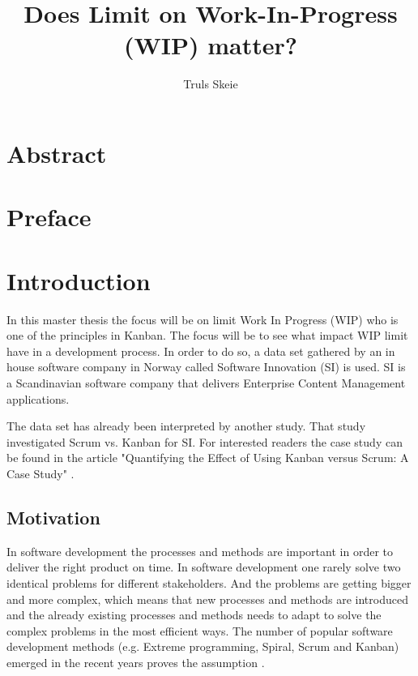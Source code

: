 \documentclass[UKenglish]{ifimaster}  %
\title{Does Limit on Work-In-Progress (WIP) matter?}        %
\author{Truls Skeie}                      %
\begin{document}
\ififorside{}
\frontmatter{}
\maketitle{}

\chapter*{Abstract}                   %

\tableofcontents{}
\listoffigures{}
\listoftables{}
\lstlistoflistings{}

\chapter*{Preface}                    %

\mainmatter{}
\chapter{Introduction}
\label{chap:intro}
In this master thesis the focus will be on limit Work In Progress (WIP) who is one of the principles in Kanban. The focus will be to see what impact WIP limit have in a development process. In order to do so, a data set gathered by an in house software company in Norway called Software Innovation (SI) is used. SI is a Scandinavian software company that delivers Enterprise Content Management applications. 

The data set has already been interpreted by another study. That study investigated Scrum vs. Kanban for SI. For interested readers the case study can be found in the article "Quantifying the Effect of Using Kanban versus Scrum: A Case Study" \parencite{Dag}. 

\section{Motivation}
In software development the processes and methods are important in order to deliver the right product on time. In software development one rarely solve two identical problems for different stakeholders. And the problems are getting bigger and more complex, which means that new processes and methods are introduced and the already existing processes and methods needs to adapt to solve the complex problems in the most efficient ways.  The number of popular software development methods  (e.g. Extreme programming, Spiral, Scrum and Kanban) emerged in the recent years proves the assumption \parencite{gandomani2013important} \parencite{ikonen2010exploring}.
\end{document}
